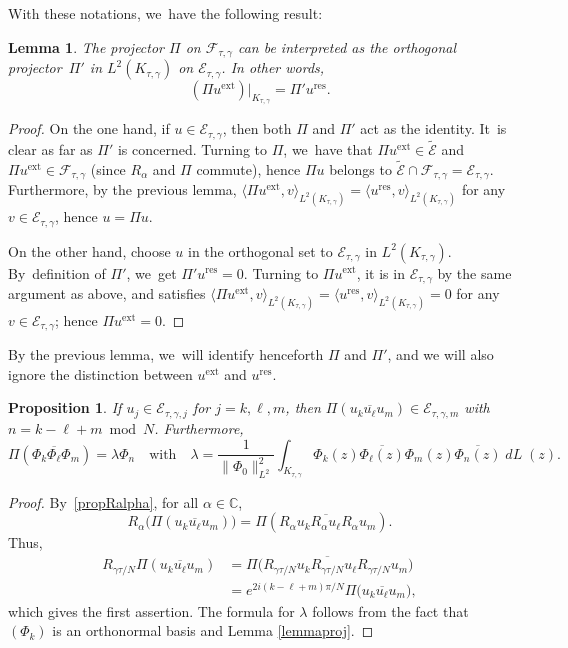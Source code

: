 \documentclass[10pt]{amsart}
\newcommand{\ext}{\mathrm{ext}}
\newcommand{\res}{\mathrm{res}}
\DeclareMathOperator{\dL}{\mathit{dL}}
\newtheorem{lemme}[theorem]{Lemma}
\newtheorem{prop}[theorem]{Proposition}
\theoremstyle{definition}
\let\ov\overline
\newcommand\C{\mathbb C}
\begin{document}
With these notations, we~have the following result:

\begin{lemme} \label{lemmaproj2}
The projector $\Pi$ on $\mathcal{F}_{\tau,\gamma}$ can be interpreted as the orthogonal projector~$\Pi'$ in $L^2(K_{\tau,\gamma})$ on $\mathcal{E}_{\tau,\gamma}$. In other words,
\[
(\Pi u^{\ext})\big|_{K_{\tau,\gamma}} = \Pi' u^{\res}.
\]
\end{lemme}

\begin{proof} On the one hand, if $u \in \mathcal{E}_{\tau,\gamma}$, then both $\Pi$ and $\Pi'$ act as the identity. It~is clear as far as $\Pi'$ is concerned. Turning to $\Pi$, we~have that $\Pi u^{\ext} \in \widetilde{\mathcal{E}}$ and $\Pi u^{\ext} \in \mathcal{F}_{\tau,\gamma}$ (since $R_\alpha$ and $\Pi$ commute), hence $\Pi u$ belongs to $\widetilde{\mathcal{E}} \cap \mathcal{F}_{\tau,\gamma} = \mathcal{E}_{\tau,\gamma}$. Furthermore, by the previous lemma, $\langle \Pi u^{\ext}, v \rangle_{L^2(K_{\tau,\gamma})} = \langle u^{\res}, v \rangle_{L^2(K_{\tau,\gamma})}$ for any $v \in \mathcal{E}_{\tau,\gamma}$, hence $u = \Pi u$.

On the other hand, choose $u$ in the orthogonal set to $\mathcal{E}_{\tau,\gamma}$ in $L^2(K_{\tau,\gamma})$. By~definition of $\Pi'$, we~get $\Pi' u^{\res} = 0$. Turning to $\Pi u^{\ext}$, it is in $\mathcal{E}_{\tau,\gamma}$ by the same argument as above, and satisfies $\langle \Pi u^{\ext}, v \rangle_{L^2(K_{\tau,\gamma})} = \langle u^{\res}, v \rangle_{L^2(K_{\tau,\gamma})}=0$ for any $v \in \mathcal{E}_{\tau,\gamma}$; hence $\Pi u^{\ext} = 0$.
\end{proof}

By the previous lemma, we~will identify henceforth $\Pi$ and $\Pi'$, and we will also ignore the distinction between $u^{\ext}$ and $u^{\res}$.

\begin{prop}
If $u_j \in \mathcal{E}_{\tau,\gamma,j}$ for $j=k, \ell, m$, then $\Pi(u_k \ov{u_{\ell}} {u_m})\in \mathcal{E}_{\tau,\gamma,m} $ with $n=k-\ell+m\bmod N$.
Furthermore,
\[
\Pi (\Phi_{k} \ov{\Phi_{\ell}} \Phi_{m}) = \lambda \Phi_{n} \quad \text{with} \quad \lambda = \frac{1}{\| \Phi_0 \|_{L^2}^2} \int_{K_{\tau, \gamma}} \Phi_{k}(z) \ov{\Phi_{\ell}(z)} \Phi_{m}(z)\ov{\Phi_{n}(z)} \dL(z).
\]
\end{prop}

\begin{proof} By~\eqref{propRalpha}, for all $\alpha \in \C$,
\[
R_\alpha\bigl(\Pi(u_k \ov{u_\ell} {u_m})\bigr) =\Pi(R_\alpha u_k \ov{R_\alpha u_\ell} {R_\alpha u_m}).
\]
Thus,
\begin{align*}
R_{{\gamma \tau}/{N}} \Pi(u_k \ov{u_\ell} {u_m})&= \Pi\bigl(R_{{\gamma \tau}/{N}} u_k \ov{ R_{{\gamma \tau}/{N}}} u_\ell {R_{{\gamma \tau}/{N}} u_m}\bigr)\\
&= e^{{2i(k-\ell+m)\pi}/N}\Pi\bigl(u_k \ov{u_\ell} {u_m}\bigr),
\end{align*}
which gives the first assertion. The formula for $\lambda$ follows from the fact that $(\Phi_k)$ is an orthonormal basis and Lemma \ref{lemmaproj}.
\end{proof}
\end{document}
